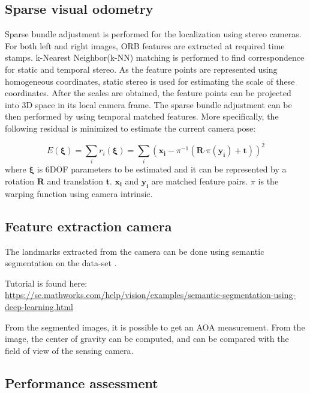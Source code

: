\subsection{Sparse visual odometry}

 Sparse bundle adjustment is performed for the localization using stereo cameras. For both left and right images, ORB features are extracted at required time stamps. k-Nearest Neighbor(k-NN) matching is performed to find correspondence for static and temporal stereo. As the feature points are represented using homogeneous coordinates, static stereo is used for estimating the scale of these coordinates. After the scales are obtained, the feature points can be projected into 3D space in its local camera frame. The sparse bundle adjustment can be then performed by using temporal matched features. More specifically, the following residual is minimized to estimate the current camera pose:

	\begin{equation} \label{eq:pnp}
	E (\bm{\xi}) = \sum_i r_i(\bm{\xi}) = \sum_i ( \bm{x_i} - \pi^{-1}( \mathbf{R} \mathbf{\cdot} \pi(\bm{y_i}) + \mathbf{t}))^2
	\end{equation}
 where $\bm{\xi}$ is 6DOF parameters to be estimated and it can be represented by a rotation $\mathbf{R}$ and translation $\mathbf{t}$. $\bm{x_i}$ and $\bm{y_i}$ are matched feature pairs. $\pi$ is the warping function using camera intrinsic. 
 

\subsection{Feature extraction camera}

The landmarks extracted from the camera can be done using semantic
segmentation on the data-set \cite{Brostow:2009:SOC:1464534.1465403}.

Tutorial is found here:
\url{https://se.mathworks.com/help/vision/examples/semantic-segmentation-using-deep-learning.html}

From the segmented images, it is possible to get an \gls{AOA}
measurement. From the image, the center of gravity can be computed,
and can be compared with the field of view of the sensing camera.



\subsection{Performance assessment}

